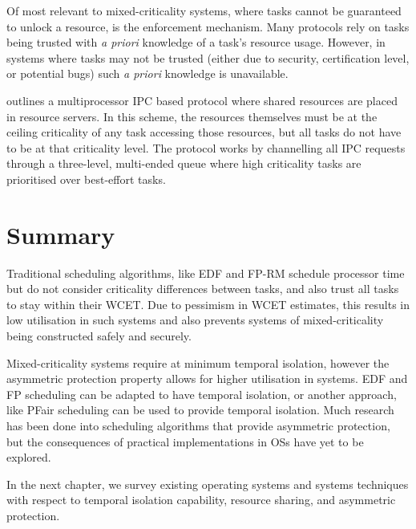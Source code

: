 Of most relevant to mixed-criticality systems, where tasks cannot be guaranteed to unlock a
resource, is the enforcement mechanism.  Many protocols rely on tasks being trusted with \emph{a
priori} knowledge of a task's resource usage.  However, in systems where tasks may not be trusted
(either due to security, certification level, or potential bugs) such \emph{a priori}
knowledge is unavailable. 

\citet{Brandenburg_14} outlines a multiprocessor \gls{IPC} based protocol where shared resources are placed in
resource servers. In this scheme, the resources themselves must be at the ceiling
criticality of any task accessing those resources, but all tasks do not have to be at that
criticality level. The protocol works by channelling all IPC requests through a three-level,
multi-ended queue where high criticality tasks are prioritised over best-effort tasks. 

\section{Summary}


Traditional scheduling algorithms, like \gls{EDF} and \gls{FP}-\gls{RM} schedule processor time but do not consider criticality differences between tasks, and also trust all tasks to stay within their \gls{WCET}.
Due to pessimism in \gls{WCET} estimates, this results in low utilisation in such systems and also
prevents systems of mixed-criticality being constructed safely and securely.

Mixed-criticality systems require at minimum temporal isolation, however the asymmetric protection property allows for higher utilisation in systems. %
\gls{EDF} and \gls{FP} scheduling can be adapted to have temporal isolation, or another approach, like PFair scheduling can be used to provide temporal isolation.
Much research has been done into scheduling algorithms that provide asymmetric protection, but the consequences of practical implementations in \glspl{OS} have yet to be explored.

In the next chapter, we survey existing operating systems and systems techniques with respect to temporal isolation capability, resource sharing, and asymmetric protection.

